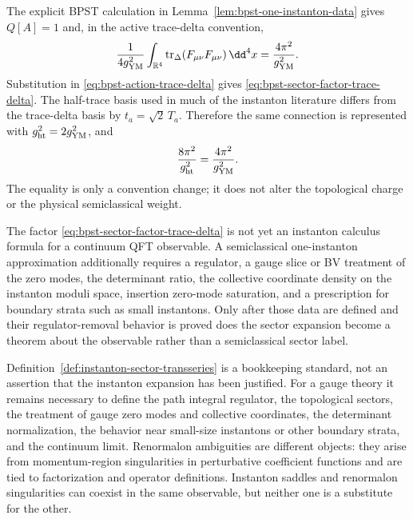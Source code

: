 The explicit BPST calculation in
Lemma~\ref{lem:bpst-one-instanton-data} gives \(Q[A]=1\) and, in the
active trace-delta convention,
\[
  \frac{1}{4g_{\rm YM}^2}
  \int_{\mathbb R^4}
  \operatorname{tr}_\Delta(F_{\mu\nu}F_{\mu\nu})\,\dd^4x
  =
  \frac{4\pi^2}{g_{\rm YM}^2}.
\]
Substitution in \eqref{eq:bpst-action-trace-delta} gives
\eqref{eq:bpst-sector-factor-trace-delta}.  The half-trace basis used in much
of the instanton literature differs from the trace-delta basis by
\(t_a=\sqrt2\,T_a\).  Therefore the same connection is represented with
\(g_{\rm ht}^2=2g_{\rm YM}^2\), and
\[
  \frac{8\pi^2}{g_{\rm ht}^2}
  =
  \frac{4\pi^2}{g_{\rm YM}^2}.
\]
The equality is only a convention change; it does not alter the topological
charge or the physical semiclassical weight.

\begin{controlledapproximation}
\label{capprox:semiclassical-instanton-expansion-status}
The factor \eqref{eq:bpst-sector-factor-trace-delta} is not yet an instanton
calculus formula for a continuum QFT observable.  A semiclassical
one-instanton approximation additionally requires a regulator, a gauge slice
or BV treatment of the zero modes, the determinant ratio, the collective
coordinate density on the instanton moduli space, insertion zero-mode
saturation, and a prescription for boundary strata such as small instantons.
Only after those data are defined and their regulator-removal behavior is
proved does the sector expansion become a theorem about the observable rather
than a semiclassical sector label.
\end{controlledapproximation}

\begin{remark}
\label{rem:instanton-renormalon-application-status}
Definition~\ref{def:instanton-sector-transseries} is a bookkeeping standard,
not an assertion that the instanton expansion has been justified.
For a gauge theory it remains necessary to define the path integral regulator,
the topological sectors, the treatment of gauge zero modes and collective
coordinates, the determinant normalization, the behavior near small-size
instantons or other boundary strata, and the continuum limit.  Renormalon
ambiguities are different objects: they arise from momentum-region
singularities in perturbative coefficient functions and are tied to
factorization and operator definitions.  Instanton saddles and renormalon
singularities can coexist in the same observable, but neither one is a
substitute for the other.
\end{remark}

